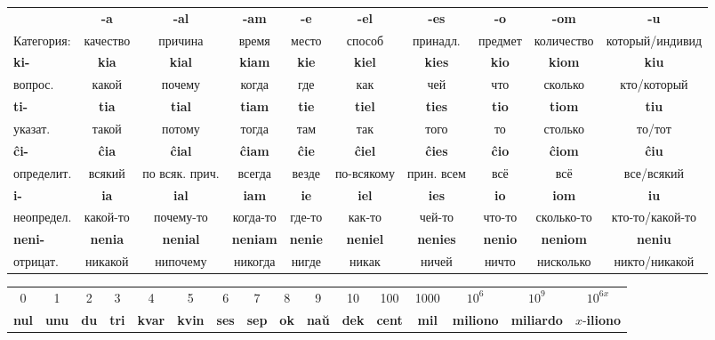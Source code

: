 \documentclass{article}
\def\b#1{\textbf{#1}}
\begin{document}
\begin{tabular}{lccccccccc}
 & \b{-a} & \b{-al} & \b{-am} & \b{-e} & \b{-el} & \b{-es} & \b{-o} & \b{-om} & \b{-u} \\
Категория: & качество & причина & время & место & способ & принадл. & предмет & количество & который/индивид \\
\b{ki-} & \b{kia} & \b{kial} & \b{kiam} & \b{kie} & \b{kiel} & \b{kies} & \b{kio} & \b{kiom} & \b{kiu} \\
вопрос. & какой & почему & когда & где & как & чей & что & сколько & кто/который \\
\b{ti-} & \b{tia} & \b{tial} & \b{tiam} & \b{tie} & \b{tiel} & \b{ties} & \b{tio} & \b{tiom} & \b{tiu} \\
указат. & такой & потому & тогда & там & так & того & то & столько & то/тот \\
\b{ĉi-} & \b{ĉia} & \b{ĉial} & \b{ĉiam} & \b{ĉie} & \b{ĉiel} & \b{ĉies} & \b{ĉio} & \b{ĉiom} & \b{ĉiu} \\
определит. & всякий & по всяк. прич. & всегда & везде & по-всякому & прин. всем & всё & всё & все/всякий \\
\b{i-} & \b{ia} & \b{ial} & \b{iam} & \b{ie} & \b{iel} & \b{ies} & \b{io} & \b{iom} & \b{iu} \\
неопредел. & какой-то & почему-то & когда-то & где-то & как-то & чей-то & что-то & сколько-то & кто-то/какой-то \\
\b{neni-} & \b{nenia} & \b{nenial} & \b{neniam} & \b{nenie} & \b{neniel} & \b{nenies} & \b{nenio} & \b{neniom} & \b{neniu} \\
отрицат. & никакой & нипочему & никогда & нигде & никак & ничей & ничто & нисколько & никто/никакой \\
\end{tabular}

\begin{tabular}{cccccccccccccccc}
0 & 1 & 2 & 3 & 4 & 5 & 6 & 7 & 8 & 9 & 10 & 100 & 1000 & $10^6$ & $10^9$ & $10^{6x}$ \\
\b{nul} & \b{unu} & \b{du} & \b{tri} & \b{kvar} & \b{kvin} & \b{ses} & \b{sep} & \b{ok} & \b{naŭ} & \b{dek} & \b{cent} & \b{mil} & \b{miliono} & \b{miliardo} & $x$-\b{iliono} \\
\end{tabular}
\end{document}
